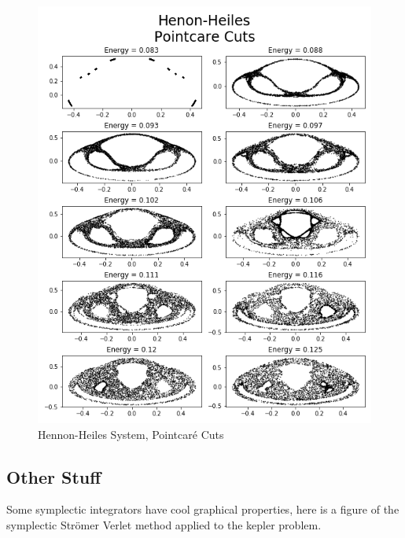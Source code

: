 \documentclass[12pt]{article}
\begin{document}
\begin{figure}[H]
    \centering
    \includegraphics[width=0.88\linewidth ]{"Figures/pointcare cuts hennon-heiles/hennon-heiles_pointcare_cuts"}
    \caption{Hennon-Heiles System, Pointcar\'e Cuts}
    \label{fig:hennon-heiles pointcare cuts}
\end{figure}

\subsection{Other Stuff}

Some symplectic integrators have cool graphical properties, here is a figure of the symplectic Str\"omer Verlet method applied to the kepler problem.
\end{document}
